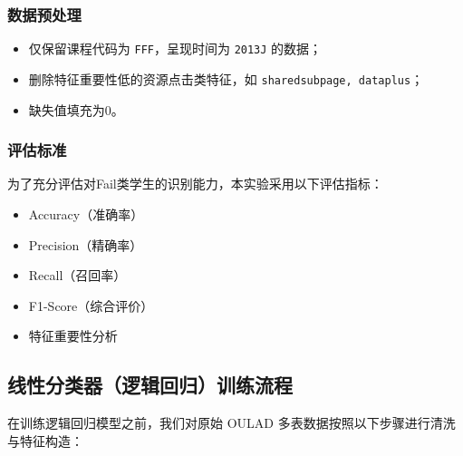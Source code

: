 \documentclass{SYSUReport}
\begin{document}
\subsubsection{数据预处理}
\begin{itemize}
    \item 仅保留课程代码为 \texttt{FFF}，呈现时间为 \texttt{2013J} 的数据；
    \item 删除特征重要性低的资源点击类特征，如 \texttt{sharedsubpage, dataplus}；
    \item 缺失值填充为0。
\end{itemize}

\subsubsection{评估标准}
为了充分评估对Fail类学生的识别能力，本实验采用以下评估指标：
\begin{itemize}
    \item Accuracy（准确率）
    \item Precision（精确率）
    \item Recall（召回率）
    \item F1-Score（综合评价）
    \item 特征重要性分析
\end{itemize}

\subsection{线性分类器（逻辑回归）训练流程}
在训练逻辑回归模型之前，我们对原始 OULAD 多表数据按照以下步骤进行清洗与特征构造：
\end{document}
